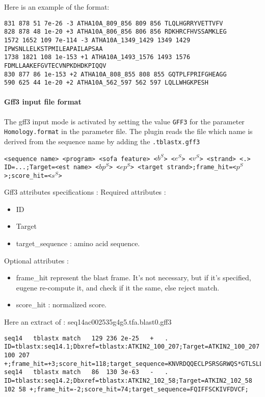 Here is an example of the format:
\begin{Verbatim}[fontsize=\small]
831 878 51 7e-26 -3 ATHA10A_809_856 809 856 TLQLHGRRYVETTVFV
828 878 48 1e-20 +3 ATHA10A_806_856 806 856 RDKHRCFHVSSAMKLEG
1572 1652 109 7e-114 -3 ATHA10A_1349_1429 1349 1429 IPWSNLLELKSTPMILEAPAILAPSAA
1738 1821 108 1e-153 +1 ATHA10A_1493_1576 1493 1576 FDMLLAAKEFGVTECVNPKDHDKPIQQV
830 877 86 1e-153 +2 ATHA10A_808_855 808 855 GQTPLFPRIFGHEAGG
590 625 44 1e-20 +2 ATHA10A_562_597 562 597 LQLLWHGKPESH
\end{Verbatim}

\paragraph{Gff3 input file format}

The gff3 input mode is activated by setting the value \texttt{GFF3} for the parameter
\texttt{Homology.format} in the parameter file.
The plugin reads the file which name is derived from the sequence name by adding the \texttt{.tblastx.gff3}

\texttt{<sequence name> <program> <sofa feature> <$b^S$> <$e^S$> <$v^S$> <strand> <.> ID=...;Target=<est name> <$bp^S$> <$ep^S$> <target strand>;frame\_hit=<$p^S$>;score\_hit=<$s^S$>}

Gff3 attributes specifications :
Required attributes : 
	\begin{itemize}
	\item ID
	\item Target
	\item target\_sequence : amino acid sequence.
	\end{itemize}
Optional attributes : 
	\begin{itemize}
	\item frame\_hit represent the blast frame. It's not necessary, 
	but if it's specified, eugene re-compute it, and check if it the same, else reject match.
	\item score\_hit :  normalized score.
	\end{itemize}


Here an extract of : seq14ac002535g4g5.tfa.blast0.gff3
\begin{Verbatim}[fontsize=\tiny]
seq14	tblastx	match	129	236	2e-25	+	.	ID=tblastx:seq14.1;Dbxref=tblastx:ATKIN2_100_207;Target=ATKIN2_100_207 100 207 +;frame_hit=+3;score_hit=118;target_sequence=KNVRDQQECLPSRSGRWQS*GTLSLLEQSTDRLFKL;
seq14	tblastx	match	86	130	3e-63	-	.	ID=tblastx:seq14.2;Dbxref=tblastx:ATKIN2_102_58;Target=ATKIN2_102_58 102 58 +;frame_hit=-2;score_hit=74;target_sequence=FQIFFSCKIVFDVCF;
\end{Verbatim}

